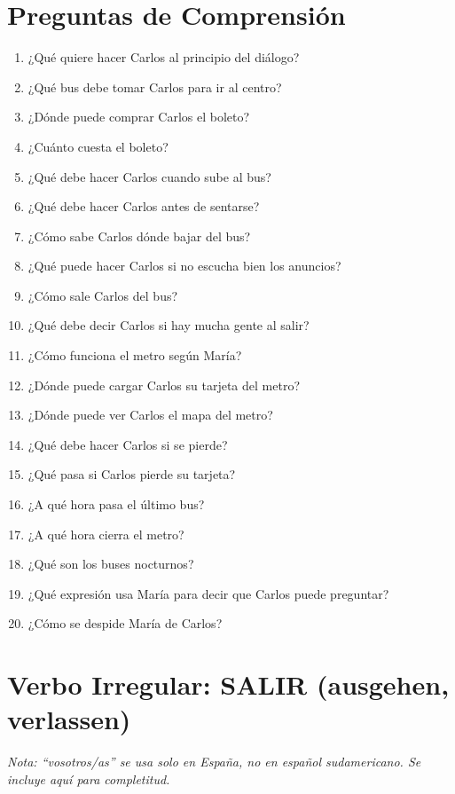 \documentclass[12pt,a4paper]{article}
\begin{document}
\newpage

\section*{Preguntas de Comprensión}

\begin{enumerate}[leftmargin=*]
    \item ¿Qué quiere hacer Carlos al principio del diálogo?
    \item ¿Qué bus debe tomar Carlos para ir al centro?
    \item ¿Dónde puede comprar Carlos el boleto?
    \item ¿Cuánto cuesta el boleto?
    \item ¿Qué debe hacer Carlos cuando sube al bus?
    \item ¿Qué debe hacer Carlos antes de sentarse?
    \item ¿Cómo sabe Carlos dónde bajar del bus?
    \item ¿Qué puede hacer Carlos si no escucha bien los anuncios?
    \item ¿Cómo sale Carlos del bus?
    \item ¿Qué debe decir Carlos si hay mucha gente al salir?
    \item ¿Cómo funciona el metro según María?
    \item ¿Dónde puede cargar Carlos su tarjeta del metro?
    \item ¿Dónde puede ver Carlos el mapa del metro?
    \item ¿Qué debe hacer Carlos si se pierde?
    \item ¿Qué pasa si Carlos pierde su tarjeta?
    \item ¿A qué hora pasa el último bus?
    \item ¿A qué hora cierra el metro?
    \item ¿Qué son los buses nocturnos?
    \item ¿Qué expresión usa María para decir que Carlos puede preguntar?
    \item ¿Cómo se despide María de Carlos?
\end{enumerate}

\newpage

\section*{Verbo Irregular: SALIR (ausgehen, verlassen)}

\textit{Nota: \enquote{vosotros/as} se usa solo en España, no en español sudamericano. Se incluye aquí para completitud.}
\end{document}
